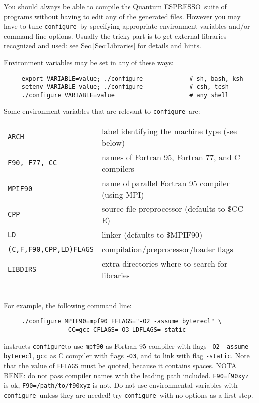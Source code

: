 \documentclass[12pt,a4paper]{article}
\def\qe{{\sc Quantum ESPRESSO}}
\def\configure{\texttt{configure}}
\begin{document}
You should always be able to compile the \qe\ suite
of programs without having to edit any of the generated files. However you
may have to tune \configure\ by specifying appropriate environment variables
and/or command-line options. Usually the tricky part is to get external
libraries recognized and used: see Sec.\ref{Sec:Libraries}
for details and hints.

Environment variables may be set in any of these ways:
\begin{verbatim}
     export VARIABLE=value; ./configure             # sh, bash, ksh
     setenv VARIABLE value; ./configure             # csh, tcsh
     ./configure VARIABLE=value                     # any shell
\end{verbatim}
Some environment variables that are relevant to \configure\ are:

\begin{tabular}{ll}
\texttt{ARCH}& label identifying the machine type (see below)\\
\texttt{F90, F77, CC} &names of Fortran 95, Fortran 77, and C compilers\\
\texttt{MPIF90} &       name of parallel Fortran 95 compiler (using MPI)\\
\texttt{CPP} &          source file preprocessor (defaults to \$CC -E)\\
\texttt{LD} &           linker (defaults to \$MPIF90)\\
\texttt{(C,F,F90,CPP,LD)FLAGS}& compilation/preprocessor/loader flags\\
\texttt{LIBDIRS}&     extra directories where to search for libraries\\
\end{tabular}\\
For example, the following command line:
\begin{verbatim}
     ./configure MPIF90=mpf90 FFLAGS="-O2 -assume byterecl" \
                  CC=gcc CFLAGS=-O3 LDFLAGS=-static
\end{verbatim}
instructs \configure to use \texttt{mpf90} as Fortran 95 compiler 
with flags \texttt{-O2 -assume byterecl}, \texttt{gcc} as C compiler with 
flags \texttt{-O3}, and to link with flag \texttt{-static}. 
Note that the value of \texttt{FFLAGS} must be quoted, because it contains
spaces. NOTA BENE: do not pass compiler names with the leading path
included. \texttt{F90=f90xyz} is ok, \texttt{F90=/path/to/f90xyz} is not. 
Do not use
environmental variables with \configure\ unless they are needed! try
\configure\ with no options as a first step.
\end{document}
